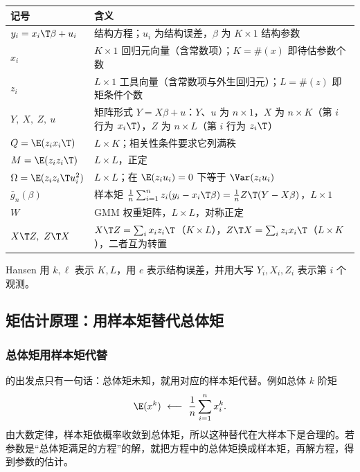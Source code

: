\begin{center}
\small
\begin{tabularx}{\linewidth}{>{\raggedright\arraybackslash}p{3.3cm}L}
\toprule
记号 & 含义\\
\midrule
$y_i=x_i\T\beta+u_i$ & 结构方程；$u_i$ 为结构误差，$\beta$ 为 $K\times1$ 结构参数\\
$x_i$ & $K\times1$ 回归元向量（含常数项）；$K=\#(x)$ 即待估参数个数\\
$z_i$ & $L\times1$ 工具向量（含常数项与外生回归元）；$L=\#(z)$ 即矩条件个数\\
$Y,\ X,\ Z,\ u$ & 矩阵形式 $Y=X\beta+u$：$Y$、$u$ 为 $n\times1$，$X$ 为 $n\times K$（第 $i$ 行为 $x_i\T$），$Z$ 为 $n\times L$（第 $i$ 行为 $z_i\T$）\\
$Q=\E(z_ix_i\T)$ & $L\times K$；相关性条件要求它列满秩\\
$M=\E(z_iz_i\T)$ & $L\times L$，正定\\
$\Omega=\E(z_iz_i\T u_i^2)$ & $L\times L$；在 $\E(z_iu_i)=0$ 下等于 $\Var(z_iu_i)$\\
$\bar g_n(\beta)$ & 样本矩 $\frac1n\sum_{i=1}^n z_i(y_i-x_i\T\beta)=\frac1nZ\T(Y-X\beta)$，$L\times1$\\
$W$ & GMM 权重矩阵，$L\times L$，对称正定\\
$X\T Z,\ Z\T X$ & $X\T Z=\sum_i x_iz_i\T$（$K\times L$），$Z\T X=\sum_i z_ix_i\T$（$L\times K$），二者互为转置\\
\bottomrule
\end{tabularx}
\end{center}

Hansen 用 $k,\ell$ 表示 $K,L$，用 $e$ 表示结构误差，并用大写 $Y_i,X_i,Z_i$ 表示第 $i$ 个观测。

\subsection{矩估计原理：用样本矩替代总体矩}

\subsubsection{总体矩用样本矩代替}

的出发点只有一句话：总体矩未知，就用对应的样本矩代替。例如总体 $k$ 阶矩
\[
\E(x^k)\ \longleftarrow\ \frac1n\sum_{i=1}^n x_i^k .
\]
由大数定律，样本矩依概率收敛到总体矩，所以这种替代在大样本下是合理的。若参数是“总体矩满足的方程”的解，就把方程中的总体矩换成样本矩，再解方程，得到参数的估计。

